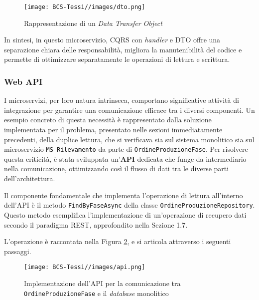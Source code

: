             \begin{figure}[H]
                \centering
                \texttt{[image: BCS-Tessi//images/dto.png]}
                \caption{Rappresentazione di un \textit{Data Transfer Object}}
                \label{fig:dto}
            \end{figure}
            
        \noindent In sintesi, in questo microservizio, CQRS con \textit{handler} e DTO offre una separazione chiara delle responsabilità, migliora la manutenibilità del codice e permette di ottimizzare separatamente le operazioni di lettura e scrittura.

        \subsubsection{Web API}
        \vspace{0.2 em}
        \noindent I microservizi, per loro natura intrinseca, comportano significative attività di integrazione per garantire una comunicazione efficace tra i diversi componenti. Un esempio concreto di questa necessità è rappresentato dalla soluzione implementata per il problema, presentato nelle sezioni immediatamente precedenti, della duplice lettura, che si verificava sia sul sistema monolitico sia sul microservizio \texttt{MS\_Rilevamento} da parte di \texttt{OrdineProduzioneFase}. Per risolvere questa criticità, è stata sviluppata un'\textbf{API} dedicata che funge da intermediario nella comunicazione, ottimizzando così il flusso di dati tra le diverse parti dell'architettura.

    
        \vspace{0.2 em}
        \noindent Il componente fondamentale che implementa l'operazione di lettura all'interno dell'API è il metodo \texttt{FindByFaseAsync} della classe \texttt{OrdineProduzioneRepository}. Questo metodo esemplifica l'implementazione di un'operazione di recupero dati secondo il paradigma REST, approfondito nella Sezione 1.7.

        \vspace{0.2 em}
        \noindent L'operazione è raccontata nella Figura \ref{fig:api}, e si articola attraverso i seguenti passaggi.

         \begin{figure}[H]
            \centering
            \texttt{[image: BCS-Tessi//images/api.png]}
            \caption{Implementazione dell'API per la comunicazione tra \texttt{OrdineProduzioneFase} e il \textit{database} monolitico}
            \label{fig:api}
        \end{figure}
        
